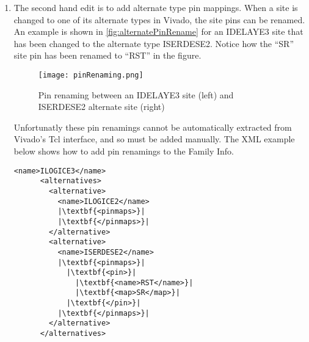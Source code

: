 \begin {enumerate}
\begin{enumerate}
      \begin{figure}[H]
        \centering
        \texttt{[image: ipadAlternates.png]}
        \caption{Alternate types of an IPAD site (highlighted in red)}
        \label{fig:ipadAlternates}
      \end{figure}
      
      \noindent As the figure shows, there are no valid alternate types.
      The only way to determine invalid alternate types is to go site-by-site in
      the family info, select an instance of the site type in Vivado's device
      browser, and click the site type dropdown box (shown in the figure above).
      If there are any site types reported in the family info XML that are not
      shown in the GUI, they need to be removed from the XML. The following Tcl
      commands can be used to select a site in Vivado (after selecting a site,
      you may have to press F9 to view the site).
      
\begin{lstlisting}[numbers=none]
Vivado% start_gui
Vivado% set site [lindex [get_sites -filter {SITE_TYPE==IPAD}] 0]
Vivado% select $site
\end{lstlisting}
      
      \item  The second hand edit is to add alternate type pin mappings. When a
      site is changed to one of its alternate types in Vivado, the site pins can
      be renamed. An example is shown in \autoref{fig:alternatePinRename} for an
      IDELAYE3 site that has been changed to the alternate type ISERDESE2.
      Notice how the ``SR'' site pin has been renamed to ``RST'' in the figure.
      
      \begin{figure}[H]
        \centering
        \texttt{[image: pinRenaming.png]}
        \caption{Pin renaming between an IDELAYE3 site (left) and ISERDESE2
        alternate site (right)}
        \label{fig:alternatePinRename}
      \end{figure}
      
      Unfortunatly these pin renamings cannot be automatically extracted from
      Vivado's Tcl interface, and so must be added manually. The XML example
      below shows how to add pin renamings to the Family Info.

\begin{lstlisting}[numbers=none]
      <name>ILOGICE3</name>
      <alternatives>
        <alternative>
          <name>ILOGICE2</name>
          |\textbf{<pinmaps>}|
          |\textbf{</pinmaps>}|
        </alternative>
        <alternative>
          <name>ISERDESE2</name>
          |\textbf{<pinmaps>}|
	        |\textbf{<pin>}|
	          |\textbf{<name>RST</name>}|
	          |\textbf{<map>SR</map>}|
	        |\textbf{</pin>}|
          |\textbf{</pinmaps>}|
        </alternative>
      </alternatives>
\end{lstlisting}
      

\end{enumerate}
\end{enumerate}
